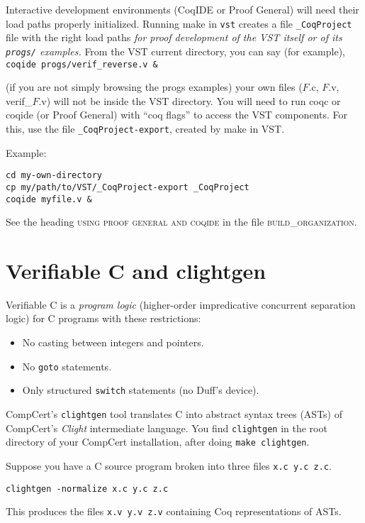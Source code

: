 \documentclass[12pt,fleqn,openany,oneside,showtrims]{memoir}
\begin{document}
\label{loadpaths}
Interactive development environments (CoqIDE or Proof General)
will need their load paths properly initialized.
Running \textsf{make} in
\lstinline{vst} creates a file \lstinline{_CoqProject} file with
the right load paths \emph{for proof development of the VST itself
or of its \lstinline{progs/} examples.}
From the VST current directory, you can say (for example),
\newline
\lstinline{coqide progs/verif_reverse.v &}

(if you are not simply browsing the \textsf{progs} examples)
your own files ($F$.c, $F$.v, verif\_$F$.v) will not be inside
the VST directory.  You will need to run coqc or coqide (or Proof General)
with ``coq flags'' to access the VST components.  For this, use
the file \lstinline{_CoqProject-export},
created by \textsf{make} in VST.

Example:
\begin{lstlisting}
cd my-own-directory
cp my/path/to/VST/_CoqProject-export _CoqProject
coqide myfile.v &
\end{lstlisting}


See the heading
\textsc{using proof general and coqide}
in the file \textsc{build\_organization}.

\chapter{Verifiable C and \textsf{clightgen}}
\label{refcard:verifiable-c}
Verifiable C is a \emph{program logic} (higher-order impredicative concurrent separation logic) for C programs with these restrictions:
\begin{itemize}
  \item No casting between integers and pointers.
  \item No \lstinline{goto} statements.
  \item Only structured \lstinline{switch} statements (no Duff's device).
\end{itemize}

CompCert's \lstinline{clightgen} tool
translates C into
abstract syntax trees (ASTs) of
CompCert's \emph{Clight} intermediate language.
You find \lstinline{clightgen} in the root directory of your CompCert installation, after doing \lstinline{make clightgen}.

Suppose you have a C source program broken into three files
\lstinline{x.c y.c z.c}.
\begin{lstlisting}
clightgen -normalize x.c y.c z.c
\end{lstlisting}
\vspace{-\baselineskip}
This produces the files \lstinline{x.v y.v z.v} containing Coq representations of ASTs.
\end{document}
